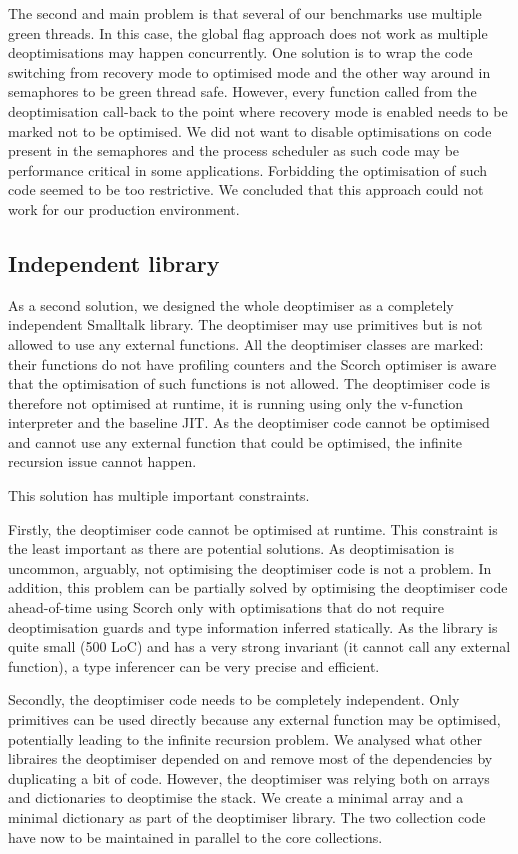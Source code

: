 \documentclass[a4paper,12pt,twoside]{../includes/ThesisStyle}
\begin{document}
The second and main problem is that several of our benchmarks use multiple green threads. In this case, the global flag approach does not work as multiple deoptimisations may happen concurrently. One solution is to wrap the code switching from recovery mode to optimised mode and the other way around in semaphores to be green thread safe. However, every function called from the deoptimisation call-back to the point where recovery mode is enabled needs to be marked not to be optimised. We did not want to disable optimisations on code present in the semaphores and the process scheduler as such code may be performance critical in some applications. Forbidding the optimisation of such code seemed to be too restrictive. We concluded that this approach could not work for our production environment.

\subsection{Independent library}

As a second solution, we designed the whole deoptimiser as a completely independent Smalltalk library. The deoptimiser may use primitives but is not allowed to use any external functions. All the deoptimiser classes are marked: their functions do not have profiling counters and the Scorch optimiser is aware that the optimisation of such functions is not allowed. The deoptimiser code is therefore not optimised at runtime, it is running using only the v-function interpreter and the baseline JIT. As the deoptimiser code cannot be optimised and cannot use any external function that could be optimised, the infinite recursion issue cannot happen.

This solution has multiple important constraints. 

Firstly, the deoptimiser code cannot be optimised at runtime. This constraint is the least important as there are potential solutions. As deoptimisation is uncommon, arguably, not optimising the deoptimiser code is not a problem. In addition, this problem can be partially solved by optimising the deoptimiser code ahead-of-time using Scorch only with optimisations that do not require deoptimisation guards and type information inferred statically. As the library is quite small (500 LoC) and has a very strong invariant (it cannot call any external function), a type inferencer can be very precise and efficient.

Secondly, the deoptimiser code needs to be completely independent. Only primitives can be used directly because any external function may be optimised, potentially leading to the infinite recursion problem. We analysed what other libraires the deoptimiser depended on and remove most of the dependencies by duplicating a bit of code. However, the deoptimiser was relying both on arrays and dictionaries to deoptimise the stack. We create a minimal array and a minimal dictionary as part of the deoptimiser library. The two collection code have now to be maintained in parallel to the core collections.
\end{document}
